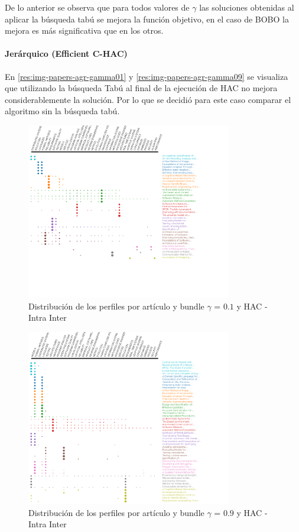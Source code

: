 De lo anterior se observa que para todos valores de $\gamma$ las soluciones obtenidas al aplicar la búsqueda tabú se mejora la función objetivo, en el caso de BOBO la mejora es más significativa que en los otros.\\

\paragraph{Jerárquico (Efficient C-HAC)}
En \ref{res:img-papers-agr-gamma01} y \ref{res:img-papers-agr-gamma09} se visualiza que utilizando la búsqueda Tabú al final de la ejecución de HAC no mejora considerablemente la solución. Por lo que se decidió para este caso comparar el algoritmo sin la búsqueda tabú.
\begin{figure}[H]
  \centering
    \includegraphics[width=0.8\textwidth]{resultados/papers/HAC/INTRA_INTER/gamma-01.png}
  \caption{Distribución de los perfiles por artículo y bundle $\gamma$ = $0.1$ y HAC - Intra Inter}
  \label{res:img-papers-gamma01-hac-intra-inter}
\end{figure}

\begin{figure}[H]
  \centering
    \includegraphics[width=0.8\textwidth]{resultados/papers/HAC/INTRA_INTER/gamma-09.png}
  \caption{Distribución de los perfiles por artículo y bundle $\gamma$ = $0.9$ y HAC - Intra Inter}
  \label{res:img-papers-gamma09-hac-intra-inter}
\end{figure}

